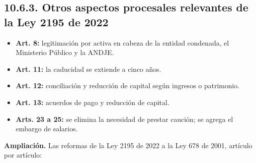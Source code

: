 \subsection{10.6.3. Otros aspectos procesales relevantes de la Ley 2195 de 2022}
\begin{itemize}
\item \textbf{Art. 8:} legitimación por activa en cabeza de la entidad condenada, el Ministerio Público y la ANDJE.
\item \textbf{Art. 11:} la caducidad se extiende a cinco años.
\item \textbf{Art. 12:} conciliación y reducción de capital según ingresos o patrimonio.
\item \textbf{Art. 13:} acuerdos de pago y reducción de capital.
\item \textbf{Arts. 23 a 25:} se elimina la necesidad de prestar caución; se agrega el embargo de salarios.
\end{itemize}
\begin{ampliacion}
\textcolor[HTML]{5B3F8C}{\textbf{Ampliación. }}Las reformas de la Ley 2195 de 2022 a la Ley 678 de 2001, artículo por artículo:
\end{ampliacion}

